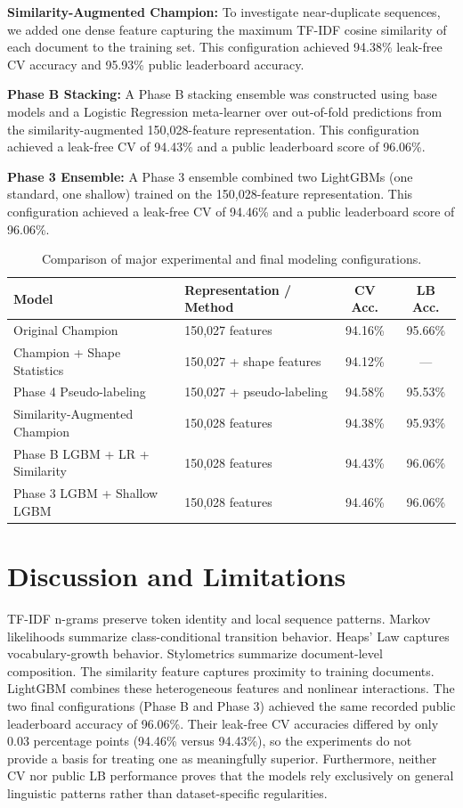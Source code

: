 \documentclass[11pt,a4paper]{article}
\begin{document}
\textbf{Similarity-Augmented Champion:} To investigate near-duplicate sequences, we added one dense feature capturing the maximum TF-IDF cosine similarity of each document to the training set. This configuration achieved 94.38\% leak-free CV accuracy and 95.93\% public leaderboard accuracy.

\textbf{Phase B Stacking:} A Phase B stacking ensemble was constructed using base models and a Logistic Regression meta-learner over out-of-fold predictions from the similarity-augmented 150,028-feature representation. This configuration achieved a leak-free CV of 94.43\% and a public leaderboard score of 96.06\%.

\textbf{Phase 3 Ensemble:} A Phase 3 ensemble combined two LightGBMs (one standard, one shallow) trained on the 150,028-feature representation. This configuration achieved a leak-free CV of 94.46\% and a public leaderboard score of 96.06\%.

\begin{table}[ht]
\centering
\caption{Comparison of major experimental and final modeling configurations.}
\vspace{2pt}
\begin{tabular}{llcc}
\hline
\textbf{Model} & \textbf{Representation / Method} & \textbf{CV Acc.} & \textbf{LB Acc.} \\
\hline
Original Champion & 150,027 features & 94.16\% & 95.66\% \\
Champion + Shape Statistics & 150,027 + shape features & 94.12\% & --- \\
Phase 4 Pseudo-labeling & 150,027 + pseudo-labeling & 94.58\% & 95.53\% \\
Similarity-Augmented Champion & 150,028 features & 94.38\% & 95.93\% \\
Phase B LGBM + LR + Similarity & 150,028 features & 94.43\% & 96.06\% \\
Phase 3 LGBM + Shallow LGBM & 150,028 features & 94.46\% & 96.06\% \\
\hline
\end{tabular}
\end{table}

\section{Discussion and Limitations}
TF-IDF n-grams preserve token identity and local sequence patterns. Markov likelihoods summarize class-conditional transition behavior. Heaps' Law captures vocabulary-growth behavior. Stylometrics summarize document-level composition. The similarity feature captures proximity to training documents. LightGBM combines these heterogeneous features and nonlinear interactions. The two final configurations (Phase B and Phase 3) achieved the same recorded public leaderboard accuracy of 96.06\%. Their leak-free CV accuracies differed by only 0.03 percentage points (94.46\% versus 94.43\%), so the experiments do not provide a basis for treating one as meaningfully superior. Furthermore, neither CV nor public LB performance proves that the models rely exclusively on general linguistic patterns rather than dataset-specific regularities.
\end{document}
